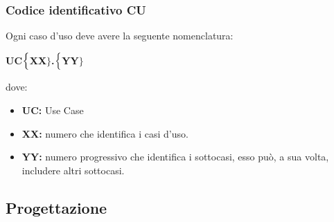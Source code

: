 \subsubsection{Codice identificativo CU}
Ogni caso d'uso deve avere la seguente nomenclatura:
\begin{center}
	\textbf{UC$\Bigl\{$XX$\Bigr\}$.$\Bigl\{$YY$\Bigr\}$}
\end{center}
dove:
\begin{itemize}
	\item \textbf{UC:} Use Case
	\item \textbf{{XX}:} numero che identifica i casi d'uso.
	\item \textbf{{YY}:} numero progressivo che identifica i sottocasi, esso può, a sua volta, includere altri sottocasi.
\end{itemize}






\subsection{Progettazione}
